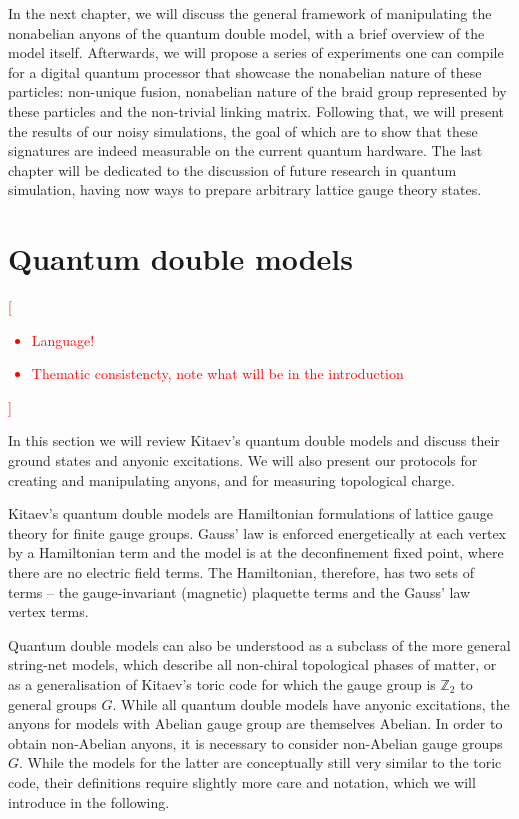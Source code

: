 \documentclass[two column]{article}
\newcommand{\caro}[1]{\textcolor{red}{[#1]}}
\begin{document}
In the next chapter, we will discuss the general framework of manipulating the nonabelian anyons of the quantum double model, with a brief overview of the model itself. Afterwards, we will propose a series of experiments one can compile for a digital quantum processor that showcase the nonabelian nature of these particles: non-unique fusion, nonabelian nature of the braid group represented by these particles and the non-trivial linking matrix. Following that, we will present the results of our noisy simulations, the goal of which are to show that these signatures are indeed measurable on the current quantum hardware. The last chapter will be dedicated to the discussion of future research in quantum simulation, having now ways to prepare arbitrary lattice gauge theory states.

\section{Quantum double models}
\caro{\begin{itemize}
\item Language!
\item Thematic consistencty, note what will be in the introduction
\end{itemize}}

In this section we will review Kitaev's quantum double models\cite{Kitaev_2003} and discuss their ground states and anyonic excitations. We will also present our protocols for creating and manipulating anyons, and for measuring topological charge. 

Kitaev's quantum double models are Hamiltonian formulations of lattice gauge theory for finite gauge groups. Gauss' law is enforced energetically at each vertex by a Hamiltonian term and the model is at the deconfinement fixed point, where there are no electric field terms.
The Hamiltonian, therefore, has two sets of terms -- the gauge-invariant (magnetic) plaquette terms and the Gauss' law vertex terms\cite{cui2018topological, Kitaev_2003}. 

Quantum double models can also be understood as a subclass of the more general string-net models\cite{Levin_2005}, which describe all non-chiral topological phases of matter, or as a generalisation of Kitaev's toric code\cite{Kitaev_2003} for which the gauge group is $\mathbb Z_2$ to general groups $G$. While all quantum double models have anyonic excitations, the anyons for models with Abelian gauge group are themselves Abelian. In order to obtain non-Abelian anyons, it is necessary to consider non-Abelian gauge groups $G$. While the models for the latter are conceptually still very similar to the toric code, their definitions require slightly more care and notation, which we will introduce in the following. 
\end{document}
